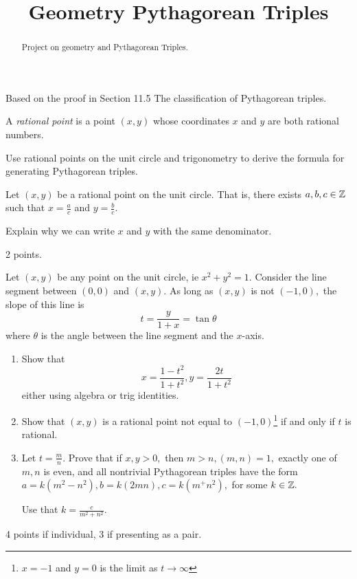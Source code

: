 \documentclass[letterpaper, 11 pt, instructornotes]{ximera}
\title{Geometry Pythagorean Triples}
\begin{document}
\begin{abstract}
 Project on geometry and Pythagorean Triples.
\end{abstract}
\maketitle


\begin{exploration} 
\begin{instructorNotes}
	Based on the proof in \cite{jones-jones} Section 11.5 The classification of Pythagorean triples.
\end{instructorNotes}
 \begin{definition}
 	A \emph{rational point} is a point $(x,y)$ whose coordinates $x$ and $y$ are both rational numbers.
\end{definition}

Use rational points on the unit circle and trigonometry to derive the formula for generating Pythagorean triples. 

\begin{problem}\label{prob:rational-form}
 	Let $(x,y)$ be a rational point on the unit circle. That is, there exists $a,b,c\in\mathbb Z$ such that $x=\frac{a}{c}$ and $y=\frac{b}{c}$.
	
	Explain why we can write $x$ and $y$ with the same denominator.
\begin{rubric}
 2 points.
\end{rubric}
\end{problem}

\begin{problem}
Let $(x,y)$ be any point on the unit circle, ie $x^2+y^2=1.$
	Consider the line segment between $(0,0)$ and $(x,y).$ As long as $(x,y)$ is not $(-1,0),$ the slope of this line is \[t=\frac{y}{1+x}=\tan\theta\] where $\theta$ is the angle between the line segment and the $x$-axis. 
	\begin{enumerate}
 		\item Show that \[x=\frac{1-t^2}{1+t^2}, y=\frac{2t}{1+t^2}\] either using algebra or trig identities.
		\item Show that $(x,y)$ is a rational point not equal to $(-1,0)$\footnote{$x=-1$ and $y=0$ is the limit as $t\to\infty$} if and only if $t$ is rational.
		\item Let $t=\frac{m}{n}.$ Prove that if $x,y>0,$ then $m>n, (m,n)=1,$ exactly one of $m,n$ is even, and all nontrivial Pythagorean triples have the form $a=k(m^2-n^2), b=k(2mn), c=k(m^+n^2),$ for some $k\in\mathbb Z.$ 
\begin{hint}
Use that $k=\frac{c}{m^2+n^2}$.
\end{hint}
 
	\end{enumerate}
\begin{rubric}
 4 points if individual, 3 if presenting as a pair.
\end{rubric}
\end{problem}

\end{exploration}
\end{document}

